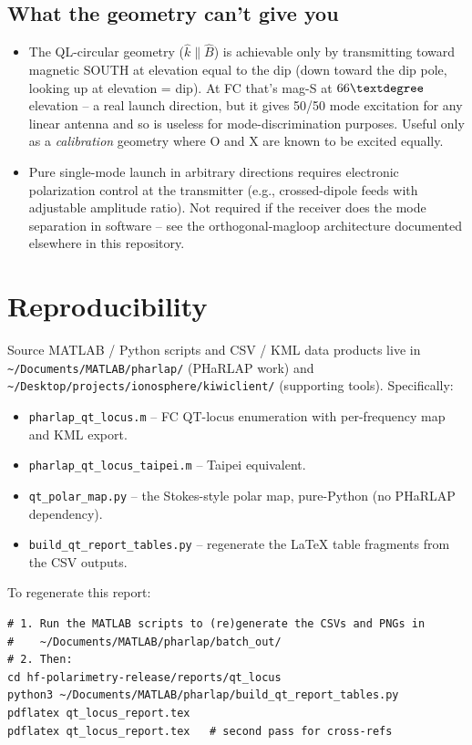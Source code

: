 \documentclass[11pt]{article}
\begin{document}
\subsection*{What the geometry can't give you}

\begin{itemize}
\item The QL-circular geometry ($\hat{k}\!\parallel\!\hat{B}$) is
  achievable only by transmitting toward magnetic SOUTH at elevation
  equal to the dip (down toward the dip pole, looking up at
  elevation = dip).  At FC that's mag-S at $66\textdegree$
  elevation -- a real launch direction, but it gives 50/50 mode
  excitation for any linear antenna and so is useless for
  mode-discrimination purposes.  Useful only as a
  \emph{calibration} geometry where O and X are known to be
  excited equally.
\item Pure single-mode launch in arbitrary directions requires
  electronic polarization control at the transmitter (e.g.,
  crossed-dipole feeds with adjustable amplitude ratio).  Not
  required if the receiver does the mode separation in software --
  see the orthogonal-magloop architecture documented elsewhere in
  this repository.
\end{itemize}


\section*{Reproducibility}

Source MATLAB / Python scripts and CSV / KML data products live in
\texttt{\textasciitilde/Documents/MATLAB/pharlap/} (PHaRLAP work) and
\texttt{\textasciitilde/Desktop/projects/ionosphere/kiwiclient/}
(supporting tools).  Specifically:

\begin{itemize}
\item \texttt{pharlap\_qt\_locus.m} -- FC QT-locus enumeration with
  per-frequency map and KML export.
\item \texttt{pharlap\_qt\_locus\_taipei.m} -- Taipei equivalent.
\item \texttt{qt\_polar\_map.py} -- the Stokes-style polar map,
  pure-Python (no PHaRLAP dependency).
\item \texttt{build\_qt\_report\_tables.py} -- regenerate the LaTeX
  table fragments from the CSV outputs.
\end{itemize}

To regenerate this report:
\begin{verbatim}
# 1. Run the MATLAB scripts to (re)generate the CSVs and PNGs in
#    ~/Documents/MATLAB/pharlap/batch_out/
# 2. Then:
cd hf-polarimetry-release/reports/qt_locus
python3 ~/Documents/MATLAB/pharlap/build_qt_report_tables.py
pdflatex qt_locus_report.tex
pdflatex qt_locus_report.tex   # second pass for cross-refs
\end{verbatim}
\end{document}
